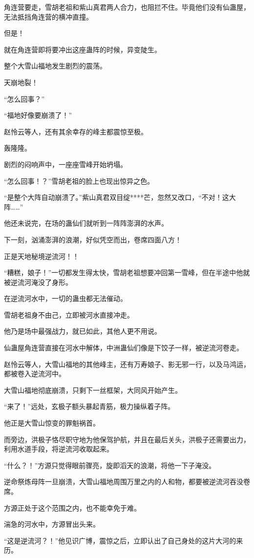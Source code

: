 \begin{this_body}
角连营要走，雪胡老祖和紫山真君两人合力，也阻拦不住。毕竟他们没有仙蛊屋，无法抵挡角连营的横冲直撞。

但是！

就在角连营即将要冲出这座蛊阵的时候，异变陡生。

整个大雪山福地发生剧烈的震荡。

天崩地裂！

“怎么回事？”

“福地好像要崩溃了！”

赵怜云等人，还有其余幸存的峰主都震惊至极。

轰隆隆。

剧烈的闷响声中，一座座雪峰开始坍塌。

“怎么回事！？”雪胡老祖的脸上也现出惊异之色。

“是整个大阵自动崩溃了。”紫山真君双目绽****芒，忽然又改口，“不对！这大阵……”

他还未说完，在场的蛊仙们就听到一阵阵澎湃的水声。

下一刻，汹涌澎湃的浪潮，好似凭空而出，卷席四面八方！

正是天地秘境逆流河！！

“糟糕，娘子！”一切都发生得太快，雪胡老祖想要冲回第一雪峰，但在半途中他就被逆流河淹没了身形。

在逆流河水中，一切的蛊虫都无法催动。

雪胡老祖身不由己，立即被河水直接冲走。

他乃是场中最强战力，就已如此，其他人更不用说。

仙蛊屋角连营直接在河水中解体，中洲蛊仙们像是下饺子一样，被逆流河卷走。

赵怜云等人，大雪山福地的其他峰主，还有万寿娘子、影无邪一行，以及马鸿运，都被卷入逆流河中。

大雪山福地彻底崩溃，只剩下一丝框架，大同风开始产生。

“来了！”远处，玄极子额头暴起青筋，极力操纵着子阵。

他正是大雪山惊变的罪魁祸首。

而旁边，洪极子恪尽职守地为他保驾护航，并且在最后关头，洪极子还需要出力，利用水道手段，将逆流河收取起来。

“什么？！”方源只觉得眼前骤亮，旋即滔天的浪潮，将他一下子淹没。

逆命祭炼母阵一旦崩溃，大雪山福地周围万里之内的人和物，都要被逆流河吞没卷席。

方源正处于这个范围之内，也不能幸免于难。

湍急的河水中，方源冒出头来。

“这是逆流河？！”他见识广博，震惊之后，立即认出了自己身处的这片大河的来历。


\end{this_body}
